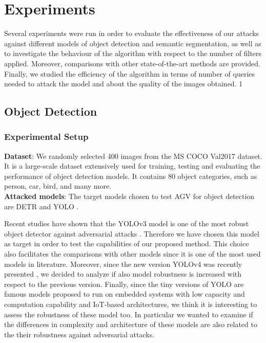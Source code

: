 \chapter{Experiments} \label{sec:experiments}
Several experiments were run in order to evaluate the effectiveness of our attacks against different models of object detection and semantic segmentation, as well as to investigate the behaviour of the algorithm with respect to the number of filters applied. Moreover, comparisons with other state-of-the-art methods are provided. 
Finally, we studied the efficiency of the algorithm in terms of number of queries needed to attack the model and about the quality of the images obtained.
1
 


\section{Object Detection}
\subsection{Experimental Setup} \label{sec:ExpSetUp_objdet}
\textbf{Dataset}: We randomly selected 400 images from the MS COCO Val2017 dataset. It is a large-scale dataset extensively used for training, testing and evaluating the performance of object detection models. It contains 80 object categories, such as person, car, bird, and many more. \\


\noindent\textbf{Attacked models}: The target models chosen to test AGV for object detection are DETR \cite{detr_paper} and YOLO \cite{yolov3} \cite{yolov4}. 

Recent studies have shown that the YOLOv3 model \cite{yolov3} is one of the most robust object detector against adversarial attacks \cite{Lu_2020_CVPR}. Therefore we have chosen this model as target in order to test the capabilities of our proposed method. This choice also facilitates the comparisons with other models since it is one of the most used models in literature. Moreover, since the new version YOLOv4 was recently presented \cite{yolov4}, we decided to analyze if also model robustness is increased with respect to the previous version. Finally, since the tiny versions of YOLO are famous models proposed to run on embedded systems with low capacity and computation capability and IoT-based architectures, we think it is interesting to assess the robustness of these model too. 
In particular we wanted to examine if the differences in complexity and architecture of these models are also related to the their robustness against adversarial attacks.

